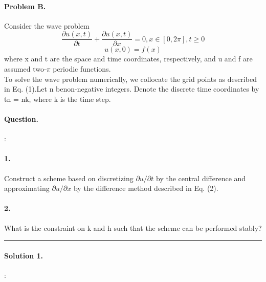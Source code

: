 \documentclass{report}
\begin{document}
\paragraph{Problem B.} Consider the wave problem
\begin{equation}
\frac{\partial{u(x,t)}}{\partial{t}}	+ \frac{\partial{u(x,t)}}{\partial{x}} = 0 , x \in [0,2\pi] , t \ge 0 
\end{equation}
\begin{equation}
u(x,0) = f(x)
\end{equation}
where x and t are the space and time coordinates, respectively, and u and f are assumed two-$\pi$ periodic
functions.\\

\qquad To solve the wave problem numerically, we collocate the grid points as described in Eq. (1).Let n benon-negative integers. Denote the discrete time coordinates by tn = nk, where k is the time step.

\paragraph{Question.} : \\
\paragraph{1.}Construct a scheme based on discretizing $\partial{u}/\partial{t}$ by the central difference and approximating  $\partial{u}/\partial{x}$
by the difference method described in Eq. (2).\\

\paragraph{2.} What is the constraint on k and h such that the scheme can be performed stably?\\
\noindent\rule[0.25\baselineskip]{\textwidth}{1pt}
\paragraph{Solution 1.} :\\
\end{document}
